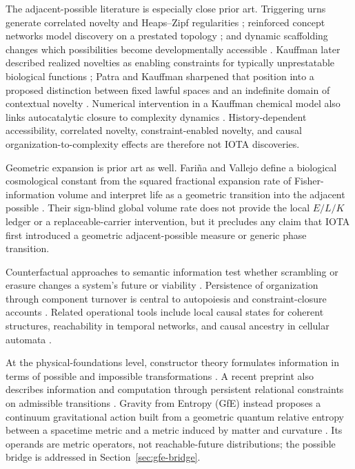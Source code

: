 The adjacent-possible literature is especially close prior art. Triggering urns
generate correlated novelty and Heaps--Zipf regularities
\cite{tria2014novelties}; reinforced concept networks model discovery on a
prestated topology \cite{iacopini2018innovation}; and dynamic scaffolding changes
which possibilities become developmentally accessible
\cite{griesemer2024scaffolded}. Kauffman later described realized novelties as
enabling constraints for typically unprestatable biological functions
\cite{kauffman2014prolegomenon}; Patra and Kauffman sharpened that position into
a proposed distinction between fixed lawful spaces and an indefinite domain of
contextual novelty \cite{patra2025domains}. Numerical intervention in a Kauffman
chemical model also links autocatalytic closure to complexity dynamics
\cite{faggian2025closure}. History-dependent accessibility, correlated novelty,
constraint-enabled novelty, and causal organization-to-complexity effects are
therefore not IOTA discoveries.

Geometric expansion is prior art as well. Fari\~na and Vallejo define a
biological cosmological constant from the squared fractional expansion rate of
Fisher-information volume and interpret life as a geometric transition into the
adjacent possible \cite{farina2026lambdaB}. Their sign-blind global volume rate
does not provide the local $E/L/K$ ledger or a replaceable-carrier intervention,
but it precludes any claim that IOTA first introduced a geometric
adjacent-possible measure or generic phase transition.

Counterfactual approaches to semantic information test whether scrambling or
erasure changes a system's future or viability
\cite{kolchinsky2018semantic,bartlett2024causal,sowinski2025causal}. Persistence
of organization through component turnover is central to autopoiesis and
constraint-closure accounts \cite{varela1974autopoiesis,beer2004autopoiesis,
montevil2015closure}. Related operational tools include local causal states for
coherent structures, reachability in temporal networks, and causal ancestry in
cellular automata \cite{rupe2018local,holme2012temporal,hintze2026rethinking}.

At the physical-foundations level, constructor theory formulates information in
terms of possible and impossible transformations
\cite{deutsch2015constructor}. A recent preprint also describes information and
computation through persistent relational constraints on admissible transitions
\cite{witte2026computation}. Gravity from Entropy (GfE) instead proposes a
continuum gravitational action built from a geometric quantum relative entropy
between a spacetime metric and a metric induced by matter and curvature
\cite{bianconi2025gravity,bianconi2026thermodynamics}. Its operands are metric
operators, not reachable-future distributions; the possible bridge is addressed
in Section~\ref{sec:gfe-bridge}.

